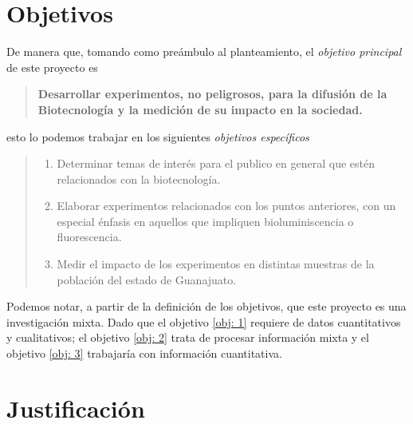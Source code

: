\documentclass[12pt]{article}
\begin{document}
\newpage
\section{Objetivos}

	\par De manera que, tomando como preámbulo al planteamiento, el \textit{ objetivo principal } de este proyecto es	
	\begin{quote}
		\textbf{Desarrollar experimentos, no peligrosos, para la difusión de la Biotecnología y la medición de su impacto en la sociedad.}
	\end{quote}
	
	\noindent esto lo podemos trabajar en los siguientes \textit{ objetivos específicos }
	
	\begin{quote} \begin{enumerate} \it
		\item Determinar temas de interés para el publico en general que estén relacionados con la biotecnología. \label{obj: 1}
		\item Elaborar experimentos relacionados con los puntos anteriores, con un especial énfasis en aquellos que impliquen bioluminiscencia o fluorescencia. \label{obj: 2}
		\item Medir el impacto de los experimentos en distintas muestras de la población del estado de Guanajuato. \label{obj: 3}
	\end{enumerate} \end{quote}
	
	\noindent Podemos notar, a partir de la definición de los objetivos, que este proyecto es una investigación mixta. Dado que el objetivo \ref{obj: 1} requiere de datos cuantitativos y cualitativos; el objetivo \ref{obj: 2} trata de procesar información mixta y el objetivo \ref{obj: 3} trabajaría con información cuantitativa.






	
\section{Justificación}
\end{document}
